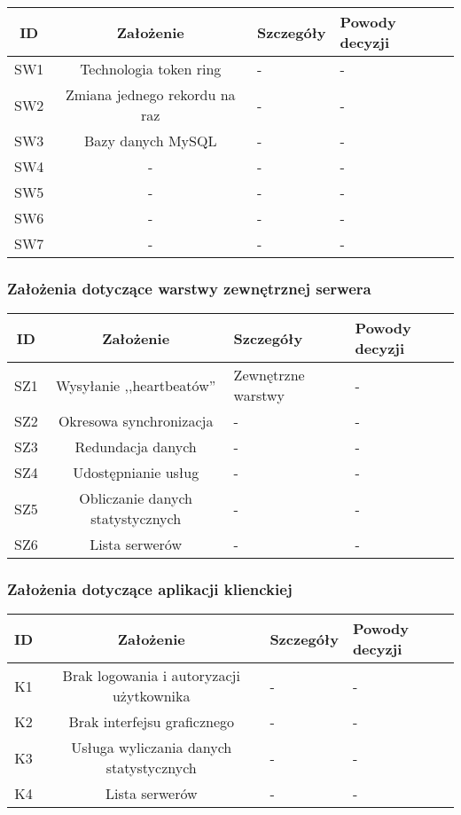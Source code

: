 \begin{center}
\begin{tabular}{|c|c|l|l|}
\hline
\textbf{ID} & \textbf{Założenie} & \textbf{Szczegóły} & \textbf{Powody decyzji} \\
\hline
\label{z:sw1} SW1 & Technologia token ring &  - & - \\
\hline
\label{z:sw2} SW2 & Zmiana jednego rekordu na raz &  - & - \\
\hline
\label{z:sw3} SW3 & Bazy danych MySQL &  - & - \\
\hline
\label{z:sw4} SW4 & - &  - & - \\
\hline
\label{z:sw5} SW5 & - &  - & - \\
\hline
\label{z:sw6} SW6 & - &  - & - \\
\hline
\label{z:sw7} SW7 & - &  - & - \\
\hline

\end{tabular} 

\subsubsection*[Założenia dotyczące warstwy zewnętrznej serwera]{Założenia dotyczące warstwy zewnętrznej serwera} \label{z:sz}

\begin{tabular}{|c|c|l|l|}
\hline
\textbf{ID} & \textbf{Założenie} & \textbf{Szczegóły} & \textbf{Powody decyzji} \\
\hline
\label{z:sz1} SZ1 & Wysyłanie ,,heartbeatów'' &  Zewnętrzne warstwy & - \\
\hline
\label{z:sz2} SZ2 & Okresowa synchronizacja &  - & - \\
\hline
\label{z:sz3} SZ3 & Redundacja danych &  - & - \\
\hline
\label{z:sz4} SZ4 & Udostępnianie usług &  - & - \\
\hline
\label{z:sz5} SZ5 & Obliczanie danych statystycznych &  - & - \\
\hline
\label{z:sz6} SZ6 & Lista serwerów &  - & - \\
\hline
\end{tabular} 

\subsubsection*[Założenia dotyczące aplikacji klienckiej]{Założenia dotyczące aplikacji klienckiej} \label{z:k}

\begin{tabular}{|c|c|l|l|}
\hline
\textbf{ID} & \textbf{Założenie} & \textbf{Szczegóły} & \textbf{Powody decyzji} \\
\hline
\label{z:k1} K1 & Brak logowania i autoryzacji użytkownika &  - & - \\
\hline
\label{z:k2} K2 & Brak interfejsu graficznego &  - & - \\
\hline
\label{z:k3} K3 & Usługa wyliczania danych statystycznych &  - & - \\
\hline
\label{z:k4} K4 & Lista serwerów &  - & - \\
\hline
\end{tabular} 

\end{center}

